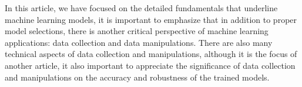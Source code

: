 
\par
In this article, we have focused on the detailed fundamentals that underline machine learning models, it is important to emphasize that in addition to proper model selections,  there is another critical perspective of machine learning applications: data collection and data manipulations. There are also many technical aspects of data collection and manipulations, although it is the focus of another article, it also important to appreciate the significance of data collection and manipulations on the accuracy and robustness of the trained models.
\par 
